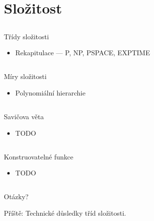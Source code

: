 \documentclass{beamer}
\begin{document}
\section{Složitost}

\subsection{}
\begin{frame}{Třídy složitosti}
\begin{itemize}
\item Rekapitulace --- P, NP, PSPACE, EXPTIME
\end{itemize}
\end{frame}

\subsection{}
\begin{frame}{Míry složitosti}
\begin{itemize}
\item Polynomiální hierarchie
\end{itemize}
\end{frame}

\subsection{}
\begin{frame}{Savičova věta}
\begin{itemize}
\item TODO
\end{itemize}
\end{frame}

\subsection{}
\begin{frame}{Konstruovatelné funkce}
\begin{itemize}
\item TODO
\end{itemize}
\end{frame}

\subsection{}
\begin{frame}{Otázky?}
\begin{center}
Příště: Technické důsledky tříd složitosti.
\end{center}
\end{frame}
\end{document}
